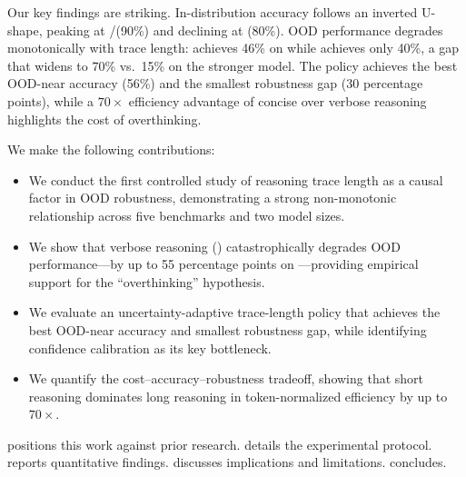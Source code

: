 Our key findings are striking. In-distribution accuracy follows an inverted U-shape, peaking at \pshort/\pmedium (90\%) and declining at \plong (80\%). OOD performance degrades monotonically with trace length: \pshort achieves 46\% on \mathfive while \plong achieves only 40\%, a gap that widens to 70\% vs.\ 15\% on the stronger \mini model. The \padaptive policy achieves the best OOD-near accuracy (56\%) and the smallest robustness gap (30 percentage points), while a $70\times$ efficiency advantage of concise over verbose reasoning highlights the cost of overthinking.

We make the following contributions:
\begin{itemize}[leftmargin=*,itemsep=0pt,topsep=0pt]
    \item We conduct the first controlled study of reasoning trace length as a causal factor in OOD robustness, demonstrating a strong non-monotonic relationship across five benchmarks and two model sizes.
    \item We show that verbose reasoning (\plong) catastrophically degrades OOD performance---by up to 55 percentage points on \mini---providing empirical support for the ``overthinking'' hypothesis.
    \item We evaluate an uncertainty-adaptive trace-length policy that achieves the best OOD-near accuracy and smallest robustness gap, while identifying confidence calibration as its key bottleneck.
    \item We quantify the cost--accuracy--robustness tradeoff, showing that short reasoning dominates long reasoning in token-normalized efficiency by up to $70\times$.
\end{itemize}

  positions this work against prior research.  details the experimental protocol.  reports quantitative findings.  discusses implications and limitations.  concludes.
